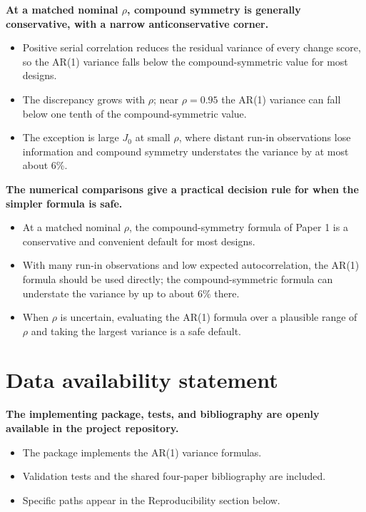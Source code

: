 \documentclass[
  11pt,
]{article}
\begin{document}
\textbf{At a matched nominal $\rho$, compound symmetry is generally conservative, with a narrow anticonservative corner.}

\begin{itemize}\setlength{\itemsep}{2pt}\setlength{\parskip}{0pt}
\item Positive serial correlation reduces the residual variance of every change score, so the AR(1) variance falls below the compound-symmetric value for most designs.
\item The discrepancy grows with $\rho$; near $\rho = 0.95$ the AR(1) variance can fall below one tenth of the compound-symmetric value.
\item The exception is large $J_0$ at small $\rho$, where distant run-in observations lose information and compound symmetry understates the variance by at most about 6\%.
\end{itemize}

\textbf{The numerical comparisons give a practical decision rule for when the simpler formula is safe.}

\begin{itemize}\setlength{\itemsep}{2pt}\setlength{\parskip}{0pt}
\item At a matched nominal $\rho$, the compound-symmetry formula of Paper 1 is a conservative and convenient default for most designs.
\item With many run-in observations and low expected autocorrelation, the AR(1) formula should be used directly; the compound-symmetric formula can understate the variance by up to about 6\% there.
\item When $\rho$ is uncertain, evaluating the AR(1) formula over a plausible range of $\rho$ and taking the largest variance is a safe default.
\end{itemize}

\section{Data availability statement}\label{data-availability-statement}

\textbf{The implementing package, tests, and bibliography are openly available in the project repository.}

\begin{itemize}\setlength{\itemsep}{2pt}\setlength{\parskip}{0pt}
\item The package implements the AR(1) variance formulas.
\item Validation tests and the shared four-paper bibliography are included.
\item Specific paths appear in the Reproducibility section below.
\end{itemize}
\end{document}
